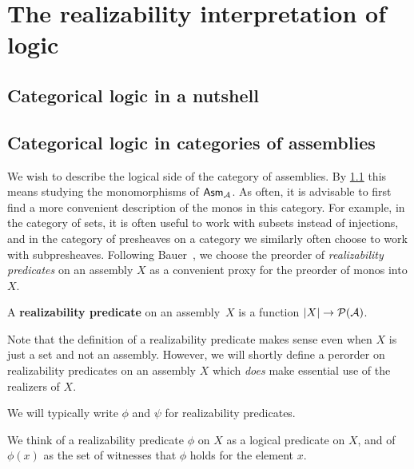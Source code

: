 \chapter{The realizability interpretation of logic}\label{chap:logic}

\section{Categorical logic in a nutshell}\label{sec:categorical-logic}

\cite{Lawvere1969}

\cite{FreydScedrov1990}
\cite{LambekScott1986,MacLaneMoerdijk1994}

\section{Categorical logic in categories of assemblies}\label{sec:cat-logic-in-asm}

We wish to describe the logical side of the category of assemblies. By
\cref{sec:categorical-logic} this means studying the monomorphisms of
\(\mathsf{Asm}_{\mathcal A}\).
%
As often, it is advisable to first find a more convenient description of the
monos in this category. For example, in the category of sets, it is often useful
to work with subsets instead of injections, and in the category of presheaves on
a category we similarly often choose to work with subpresheaves.
%
Following Bauer~\cite{Bauer2023}, we choose the preorder of \emph{realizability
  predicates} on an assembly \(X\) as a convenient proxy for the preorder of
monos into \(X\).
%


\begin{definition}
  A \textbf{realizability predicate} on an assembly~\(X\) is a function
  \(\lvert X\rvert \to \mathcal P(\mathcal A)\).
\end{definition}

Note that the definition of a realizability predicate makes sense even when
\(X\) is just a set and not an assembly. However, we will shortly define a
perorder on realizability predicates on an assembly \(X\) which \emph{does} make
essential use of the realizers of \(X\).

\begin{notation}
  We will typically write \(\phi\) and \(\psi\) for realizability predicates.
\end{notation}

We think of a realizability predicate \(\phi\) on \(X\) as a logical predicate
on \(X\), and of \(\phi(x)\) as the set of witnesses that \(\phi\) holds for the
element \(x\).

